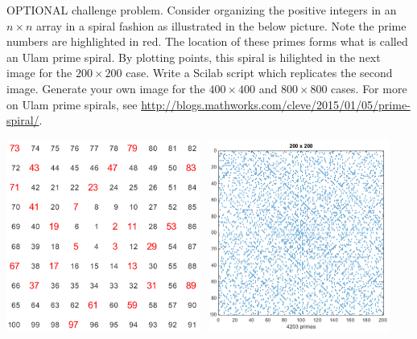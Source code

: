 \documentclass[addpoints, 11pt]{exam}
\begin{document}
\begin{questions}
\question OPTIONAL challenge problem. Consider organizing the positive integers in an $n\times n$ array in a spiral fashion as illustrated in the below picture. Note the prime numbers are highlighted in red. The location of these primes forms what is called an Ulam prime spiral. By plotting points, this spiral is hilighted in the next image for the $200 \times 200$ case. Write a Scilab script which replicates the second image. Generate your own image for the  $400 \times 400$ and  $800 \times 800$ cases. For more on Ulam prime spirals, see \url{http://blogs.mathworks.com/cleve/2015/01/05/prime-spiral/}.
\begin{center}
\includegraphics[width=2.5in, height=2.5in]{prime.png} \quad
\includegraphics[width=2.5in, height=2.5in]{spiral.png}
\end{center}

\end{questions}
\end{document}
